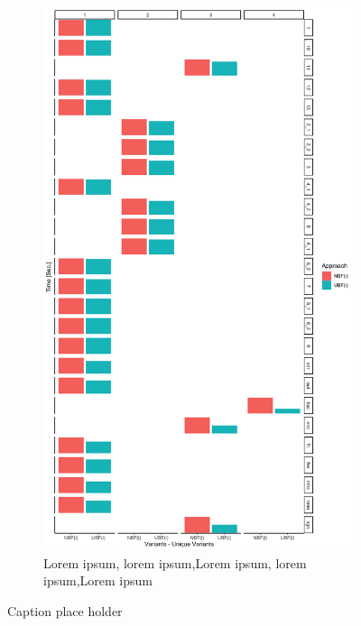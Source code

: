 \begin{figure}[t!]
\begin{subfigure}[t]{0.5\textwidth}
        \includegraphics[scale=0.09]{figs/plots/enron-nbfi-ubfi.png}
        \caption{Lorem ipsum, lorem ipsum,Lorem ipsum, lorem ipsum,Lorem ipsum}
    \end{subfigure}
    \caption{Caption place holder}
\end{figure}

